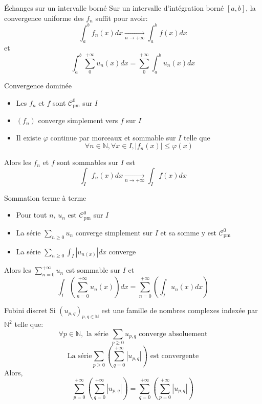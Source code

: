 \documentclass[french, a4paper, 10pt, twocolumn]{article}
\newcommand{\N}{\mathbb{N}}   %
\newcommand{\czero}{\mathcal{C}^{0}}
\newcommand{\po}{\left(}         %
\newcommand{\pf}{\right)}        %
\newcommand{\pof}[1]{\po #1 \pf} %
\renewcommand{\phi}{\varphi}
\begin{document}
\begin{theoreme}{Échanges sur un intervalle borné}
  Sur un intervalle d'intégration borné \([a,b]\), la convergence uniforme des \(f_n\) suffit pour avoir:
    \[\int_a^b f_n(x)dx \xrightarrow[n\rightarrow +\infty]{} \int_a^b f(x)dx\]
    et
    \[\int_a^b \sum_0^{+\infty} u_n(x)dx = \sum_0^{+\infty} \int_a^b u_n(x)dx\]
\end{theoreme}

\begin{theoreme}{Convergence dominée}
  \begin{itemize}[label=$\bullet$]
    \item Les \(f_n\) et \(f\) sont \(\czero_{\text{pm}}\) sur \(I\)
    \item $(f_{n})$ converge simplement vers $f$ sur \(I\)
    \item Il existe $\phi$ continue par morceaux et sommable sur \(I\) telle que
      \[\forall n \in \N, \forall x \in I, \left\lvert f_{n}(x)\right\rvert\leqslant \phi(x)\]
  \end{itemize}
  \tcblower
  Alors les $f_{n}$ et $f$ sont sommables sur $I$ est
  \[\int_{I}f_{n}(x)dx\xrightarrow[n\rightarrow +\infty]{}\int_{I}f(x)dx\]
\end{theoreme}

\begin{theoreme}{Sommation terme à terme}
  \begin{itemize}[label=$\bullet$]
    \item Pour tout $n$, $u_{n}$ est $\czero_{\text{pm}}$ sur \(I\)
    \item La série $\sum_{n \geq 0} u_{n}$ converge simplement sur \(I\) et sa somme y est \(\czero_{\text{pm}}\)
    \item La série \(\sum_{n\geqslant 0}\int_I |u_{n(x)}|dx\) converge

  \end{itemize}
  \tcblower
  Alors les $\sum\limits_{n=0}^{+\infty}u_{n}$ est sommable sur $I$ et
  \[\int_{I}\pof{\sum_{n=0}^{+\infty}u_{n}(x)}dx = \sum_{n=0}^{+\infty} \pof{\int_{I}u_{n}(x)dx}\]
\end{theoreme}

\begin{theoreme}{Fubini discret}
  Si \((u_{p,q})_{p,q \in \N}\) est une famille de nombres complexes indexée par \(\N^2\) telle que:
    \[\forall p \in \N, \text{ la série } \sum_{p\geq 0} u_{p,q} \text{ converge absoluement} \]
    \[\text{La série} \sum_{p\geq 0} \left( \sum_{q=0}^{+\infty} |u_{p,q}| \right) \text{ est convergente}\]
  Alors,
    \[\sum_{p=0}^{+\infty} \left( \sum_{q=0}^{+\infty} |u_{p,q}| \right) = \sum_{q=0}^{+\infty} \left( \sum_{p=0}^{+\infty} |u_{p,q}| \right)\]
\end{theoreme}
\end{document}
